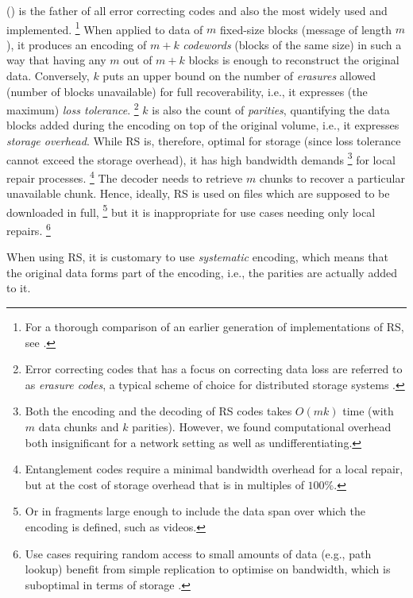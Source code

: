  () \cite{lubyetal1995CRS,plank2006optimizing,li2013erasure} 
is the father of all  error correcting codes and also the most widely used and implemented.%
%
\footnote{%
For a thorough comparison of an earlier generation of implementations of RS, see \cite{plank2009performance}.}
% 
When applied to data of $m$ fixed-size blocks (message of length $m$), it produces an encoding of $m+k$ \emph{codewords} (blocks of the same size) 
in such a way that having any $m$ out of $m+k$ blocks is enough to reconstruct the original data. Conversely, $k$ puts an upper bound on the number of \emph{erasures} allowed (number of blocks unavailable) for full recoverability, i.e., it expresses (the maximum) \emph{loss tolerance}.%
%
\footnote{Error correcting codes that has a focus on correcting data loss are referred to as \emph{erasure codes}, a typical scheme of choice for distributed storage systems \cite{balaji2018erasure}.}
%
$k$ is also the count of \emph{parities}, quantifying the data blocks added during the encoding on top of the original volume, i.e., it expresses \emph{storage overhead}. While RS is, therefore, optimal for storage (since loss tolerance cannot exceed the storage overhead), 
it has high bandwidth demands%
%
\footnote{Both the encoding and the decoding of RS codes takes $O(mk)$ time (with $m$ data chunks and $k$ parities). However, we found computational overhead both insignificant for a network setting as well as undifferentiating.}
%
for local repair processes.%
%
\footnote{Entanglement codes \cite{estrada2018alpha, estrada2019building} require a minimal bandwidth overhead for a local repair, but at the cost of storage overhead that is in multiples of $100\%$.}
%
The decoder needs to retrieve $m$ chunks to recover a particular unavailable chunk. 
Hence, ideally, RS is used on files which are supposed to be downloaded in full,%
%
\footnote{Or in  fragments large enough  to include the data span over which the encoding is defined, such as videos.}
%
 but it is inappropriate for use cases needing only local repairs.%
%
\footnote{Use cases requiring random access to small amounts of data (e.g., path lookup) benefit from simple replication to optimise on bandwidth, which is suboptimal in terms of storage \cite{weatherspoon2002erasure}.}

When using RS, it is customary to use \emph{systematic} encoding, which means that the original data forms part of the encoding, i.e., the parities are actually added to it.%
%
%
% 
%


